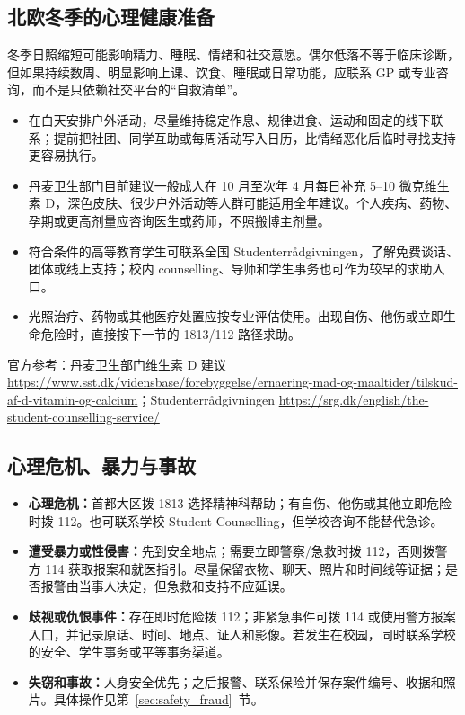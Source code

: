 \subsection{北欧冬季的心理健康准备}

冬季日照缩短可能影响精力、睡眠、情绪和社交意愿。偶尔低落不等于临床诊断，但如果持续数周、明显影响上课、饮食、睡眠或日常功能，应联系 GP 或专业咨询，而不是只依赖社交平台的“自救清单”。

\begin{itemize}[leftmargin=2em,itemsep=3pt]
  \item 在白天安排户外活动，尽量维持稳定作息、规律进食、运动和固定的线下联系；提前把社团、同学互助或每周活动写入日历，比情绪恶化后临时寻找支持更容易执行。
  \item 丹麦卫生部门目前建议一般成人在 10 月至次年 4 月每日补充 5--10 微克维生素 D，深色皮肤、很少户外活动等人群可能适用全年建议。个人疾病、药物、孕期或更高剂量应咨询医生或药师，不照搬博主剂量。
  \item 符合条件的高等教育学生可联系全国 Studenterrådgivningen，了解免费谈话、团体或线上支持；校内 counselling、导师和学生事务也可作为较早的求助入口。
  \item 光照治疗、药物或其他医疗处置应按专业评估使用。出现自伤、他伤或立即生命危险时，直接按下一节的 1813/112 路径求助。
\end{itemize}

官方参考：丹麦卫生部门维生素 D 建议 \url{https://www.sst.dk/vidensbase/forebyggelse/ernaering-mad-og-maaltider/tilskud-af-d-vitamin-og-calcium}；Studenterrådgivningen \url{https://srg.dk/english/the-student-counselling-service/}

\subsection{心理危机、暴力与事故}

\begin{itemize}[leftmargin=2em,itemsep=3pt]
  \item \textbf{心理危机：}首都大区拨 1813 选择精神科帮助；有自伤、他伤或其他立即危险时拨 112。也可联系学校 Student Counselling，但学校咨询不能替代急诊。
  \item \textbf{遭受暴力或性侵害：}先到安全地点；需要立即警察/急救时拨 112，否则拨警方 114 获取报案和就医指引。尽量保留衣物、聊天、照片和时间线等证据；是否报警由当事人决定，但急救和支持不应延误。
  \item \textbf{歧视或仇恨事件：}存在即时危险拨 112；非紧急事件可拨 114 或使用警方报案入口，并记录原话、时间、地点、证人和影像。若发生在校园，同时联系学校的安全、学生事务或平等事务渠道。
  \item \textbf{失窃和事故：}人身安全优先；之后报警、联系保险并保存案件编号、收据和照片。具体操作见第~\ref{sec:safety_fraud}~节。
\end{itemize}

